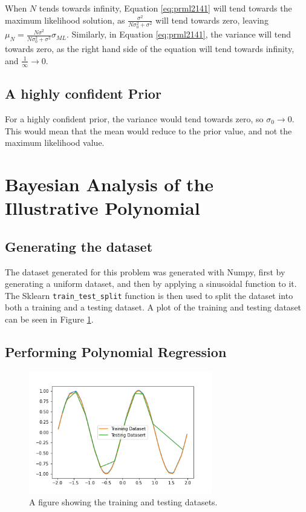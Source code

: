 \documentclass[a4paper, 11pt]{article}
\begin{document}
When $N$ tends towards infinity, Equation \ref{eq:prml2141} will tend towards the maximum likelihood solution, as $\frac{\sigma^2}{N\sigma_0^2 + \sigma^2}$ will tend towards zero, leaving $\mu_N = \frac{N\sigma^2}{N\sigma_0^2 + \sigma^2}\sigma_{ML}$. 
Similarly, in Equation \ref{eq:prml2141}, the variance will tend towards zero, as the right hand side of the equation will tend towards infinity, and $\frac{1}{\infty} \rightarrow 0$.

\subsection{A highly confident Prior}

For a highly confident prior, the variance would tend towards zero, so $\sigma_0 \rightarrow 0$. This would mean that the mean would reduce to the prior value, and not the maximum likelihood value. 

\section{Bayesian Analysis of the Illustrative Polynomial}

\subsection{Generating the dataset}
The dataset generated for this problem was generated with Numpy, first by generating a uniform dataset, and then by applying a sinusoidal function to it. The Sklearn \verb|train_test_split| function is then used to split the dataset into both a training and a testing dataset. A plot of the training and testing dataset can be seen in Figure \ref{fig:traintestsplit}.

\subsection{Performing Polynomial Regression}

\begin{figure}[h]
    \begin{center}
    \includegraphics[width=8cm]{fig/traintestsplit.png}
    \caption{A figure showing the training and testing datasets.}
    \label{fig:traintestsplit}
\end{center}
\end{figure}
\end{document}

